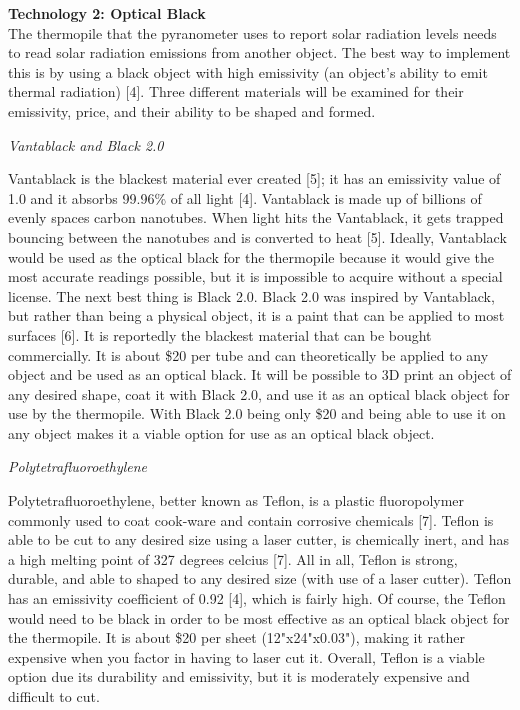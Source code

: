 \documentclass[10pt,draftclsnofoot,onecolumn,letterpaper]{article}
\begin{document}
    {\fontsize{10pt}{12.0pt} \textbf{Technology 2: Optical Black}\\The thermopile that the pyranometer uses to report solar radiation levels needs to read solar radiation emissions from another object. The best way to implement this is by using a black object with high emissivity (an object's ability to emit thermal radiation) [4]. Three different materials will be examined for their emissivity, price, and their ability to be shaped and formed.\\\selectfont 
    \par}\par
    \newpage
    {\fontsize{10pt}{12.0pt}\textit{Vantablack and Black 2.0}\\\selectfont 
    \par}\par
    {\fontsize{10pt}{12.0pt}Vantablack is the blackest material ever created [5]; it has an emissivity value of 1.0 and it absorbs 99.96\% of all light [4]. Vantablack is made up of billions of evenly spaces carbon nanotubes. When light hits the Vantablack, it gets trapped bouncing between the nanotubes and is converted to heat [5]. Ideally, Vantablack would be used as the optical black for the thermopile because it would give the most accurate readings possible, but it is impossible to acquire without a special license. The next best thing is Black 2.0. Black 2.0 was inspired by Vantablack, but rather than being a physical object, it is a paint that can be applied to most surfaces [6]. It is reportedly the blackest material that can be bought commercially. It is about \$20 per tube and can theoretically be applied to any object and be used as an optical black. It will be possible to 3D print an object of any desired shape, coat it with Black 2.0, and use it as an optical black object for use by the thermopile. With Black 2.0 being only \$20 and being able to use it on any object makes it a viable option for use as an optical black object.\\\selectfont 
    \par}\par
    {\fontsize{10pt}{12.0pt}\textit{Polytetrafluoroethylene}\\\selectfont 
    \par}\par
    {\fontsize{10pt}{12.0pt}Polytetrafluoroethylene, better known as Teflon, is a plastic fluoropolymer commonly used to coat cook-ware and contain corrosive chemicals [7]. Teflon is able to be cut to any desired size using a laser cutter, is chemically inert, and has a high melting point of 327 degrees celcius [7]. All in all, Teflon is strong, durable, and able to shaped to any desired size (with use of a laser cutter). Teflon has an emissivity coefficient of 0.92 [4], which is fairly high. Of course, the Teflon would need to be black in order to be most effective as an optical black object for the thermopile. It is about \$20 per sheet (12"x24"x0.03"), making it rather expensive when you factor in having to laser cut it. Overall, Teflon is a viable option due its durability and emissivity, but it is moderately expensive and difficult to cut.\\\selectfont 
    \par}\par
\end{document}
